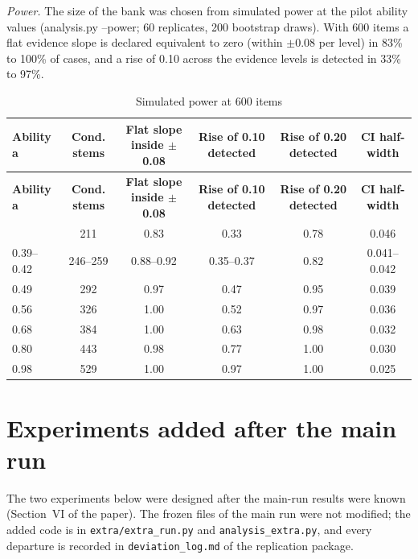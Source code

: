 \documentclass[10pt,a4paper]{article}
\begin{document}
\emph{Power.} The size of the bank was chosen from simulated power at the pilot ability values (analysis.py --power; 60 replicates, 200 bootstrap draws). With 600 items a flat evidence slope is declared equivalent to zero (within $\pm$0.08 per level) in 83\% to 100\% of cases, and a rise of 0.10 across the evidence levels is detected in 33\% to 97\%.

\begin{footnotesize}
\setlength{\tabcolsep}{2pt}
\begin{longtable}{lccccc}
\caption{Simulated power at 600 items}\\
\toprule
\textbf{Ability a} & \textbf{Cond. stems} & \textbf{Flat slope inside $\pm$0.08} & \textbf{Rise of 0.10 detected} & \textbf{Rise of 0.20 detected} & \textbf{CI half-width} \\
\midrule
\endfirsthead
\toprule
\textbf{Ability a} & \textbf{Cond. stems} & \textbf{Flat slope inside $\pm$0.08} & \textbf{Rise of 0.10 detected} & \textbf{Rise of 0.20 detected} & \textbf{CI half-width} \\
\midrule
\endhead
\bottomrule
\endfoot
0.32 & 211 & 0.83 & 0.33 & 0.78 & 0.046 \\
0.39--0.42 & 246--259 & 0.88--0.92 & 0.35--0.37 & 0.82 & 0.041--0.042 \\
0.49 & 292 & 0.97 & 0.47 & 0.95 & 0.039 \\
0.56 & 326 & 1.00 & 0.52 & 0.97 & 0.036 \\
0.68 & 384 & 1.00 & 0.63 & 0.98 & 0.032 \\
0.80 & 443 & 0.98 & 0.77 & 1.00 & 0.030 \\
0.98 & 529 & 1.00 & 0.97 & 1.00 & 0.025 \\
\end{longtable}
\end{footnotesize}

\section{Experiments added after the main run}
\label{app:extra}
The two experiments below were designed after the main-run results were known (Section~VI of the paper). The frozen files of the main run were not modified; the added code is in \texttt{extra/extra\_run.py} and \texttt{analysis\_extra.py}, and every departure is recorded in \texttt{deviation\_log.md} of the replication package.
\end{document}

